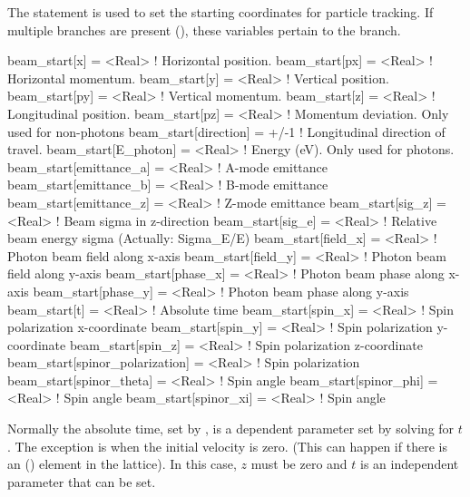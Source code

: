 The  statement is used to set the starting coordinates
for particle tracking. If multiple branches are present
(), these variables pertain to the 
branch.
\begin{example}
  beam_start[x]                   = <Real>   ! Horizontal position.
  beam_start[px]                  = <Real>   ! Horizontal momentum.
  beam_start[y]                   = <Real>   ! Vertical position.
  beam_start[py]                  = <Real>   ! Vertical momentum.
  beam_start[z]                   = <Real>   ! Longitudinal position.
  beam_start[pz]                  = <Real>   ! Momentum deviation. Only used for non-photons
  beam_start[direction]           = +/-1     ! Longitudinal direction of travel.
  beam_start[E_photon]            = <Real>   ! Energy (eV). Only used for photons.
  beam_start[emittance_a]         = <Real>   ! A-mode emittance
  beam_start[emittance_b]         = <Real>   ! B-mode emittance
  beam_start[emittance_z]         = <Real>   ! Z-mode emittance
  beam_start[sig_z]               = <Real>   ! Beam sigma in z-direction
  beam_start[sig_e]               = <Real>   ! Relative beam energy sigma (Actually: Sigma_E/E)
  beam_start[field_x]             = <Real>   ! Photon beam field along x-axis
  beam_start[field_y]             = <Real>   ! Photon beam field along y-axis
  beam_start[phase_x]             = <Real>   ! Photon beam phase along x-axis
  beam_start[phase_y]             = <Real>   ! Photon beam phase along y-axis
  beam_start[t]                   = <Real>   ! Absolute time
  beam_start[spin_x]              = <Real>   ! Spin polarization x-coordinate
  beam_start[spin_y]              = <Real>   ! Spin polarization y-coordinate
  beam_start[spin_z]              = <Real>   ! Spin polarization z-coordinate
  beam_start[spinor_polarization] = <Real>   ! Spin polarization
  beam_start[spinor_theta]        = <Real>   ! Spin angle
  beam_start[spinor_phi]          = <Real>   ! Spin angle
  beam_start[spinor_xi]           = <Real>   ! Spin angle
\end{example}
Normally the absolute time, set by , is a dependent
parameter set by solving  for $t$. The exception is when the
initial velocity is zero. (This can happen if there is an 
() element in the lattice). In this case, $z$ must be
zero and $t$ is an independent parameter that can be set.

